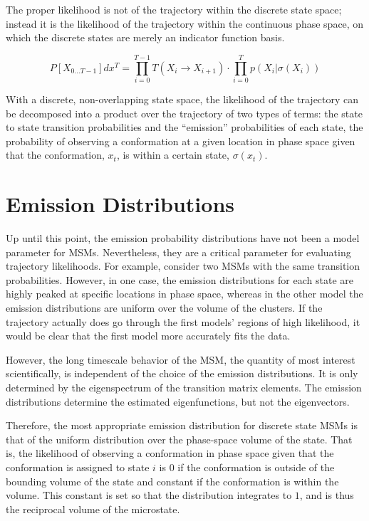 \documentclass[twocolumn,floatfix,nofootinbib,aps]{revtex4-1}
\begin{document}
The proper likelihood is not of the trajectory within the discrete state
space; instead it is the likelihood of the trajectory within the
continuous phase space, on which the discrete states are merely an
indicator function basis. 

\begin{equation}
P[X_{0...T-1}] dx^T = \prod_{i=0}^{T-1} T(X_i \rightarrow X_{i+1}) \cdot \prod_{i=0}^{T} p(X_{i} | \sigma(X_{i}))
\label{eq:like}
\end{equation}

With a discrete, non-overlapping state space, the likelihood of the
trajectory can be decomposed into a product over the trajectory of two
types of terms: the state to state transition probabilities and the
``emission'' probabilities of each state, the probability of observing a
conformation at a given location in phase space given that the
conformation, $x_t$, is within a certain state, $\sigma(x_t)$.

\section{Emission Distributions}

Up until this point, the emission probability distributions have not
been a model parameter for MSMs. Nevertheless, they are a critical
parameter for evaluating trajectory likelihoods. For example, consider two MSMs with the same transition probabilities. However, in one case, the emission distributions for each state are highly peaked at specific locations in phase space, whereas in the other model the emission distributions are uniform over the volume of the clusters. If the trajectory actually does go through the first models' regions of high likelihood, it would be clear that the first model more accurately fits the data.

However, the long timescale behavior of the MSM, the quantity of most
interest scientifically, is independent of the choice of the emission
distributions. It is only determined by the eigenspectrum of the
transition matrix elements. The emission distributions determine the
estimated eigenfunctions, but not the eigenvectors.

Therefore, the most appropriate emission distribution for discrete state
MSMs is that of the uniform distribution over the phase-space volume of
the state. That is, the likelihood of observing a conformation in phase
space given that the conformation is assigned to state $i$ is $0$
if the conformation is outside of the bounding volume of the state and
constant if the conformation is within the volume. This constant is set
so that the distribution integrates to $1$, and is thus the reciprocal
volume of the microstate.
\end{document}
